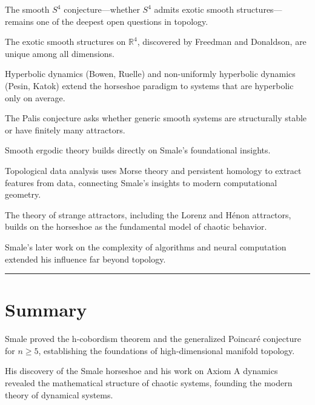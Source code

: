 The smooth $S^4$ conjecture---whether $S^4$ admits exotic smooth structures---remains one of the deepest open questions in topology.

The exotic smooth structures on $\mathbb{R}^4$, discovered by Freedman and Donaldson, are unique among all dimensions.

Hyperbolic dynamics (Bowen, Ruelle) and non-uniformly hyperbolic dynamics (Pesin, Katok) extend the horseshoe paradigm to systems that are hyperbolic only on average.

The Palis conjecture asks whether generic smooth systems are structurally stable or have finitely many attractors.

Smooth ergodic theory builds directly on Smale's foundational insights.

Topological data analysis uses Morse theory and persistent homology to extract features from data, connecting Smale's insights to modern computational geometry.

The theory of strange attractors, including the Lorenz and Hénon attractors, builds on the horseshoe as the fundamental model of chaotic behavior.

Smale's later work on the complexity of algorithms and neural computation extended his influence far beyond topology.

\begin{center}\rule{0.5\linewidth}{0.5pt}\end{center}

\section*{Summary}

Smale proved the h-cobordism theorem and the generalized Poincaré conjecture for $n \geq 5$, establishing the foundations of high-dimensional manifold topology.

His discovery of the Smale horseshoe and his work on Axiom A dynamics revealed the mathematical structure of chaotic systems, founding the modern theory of dynamical systems.
